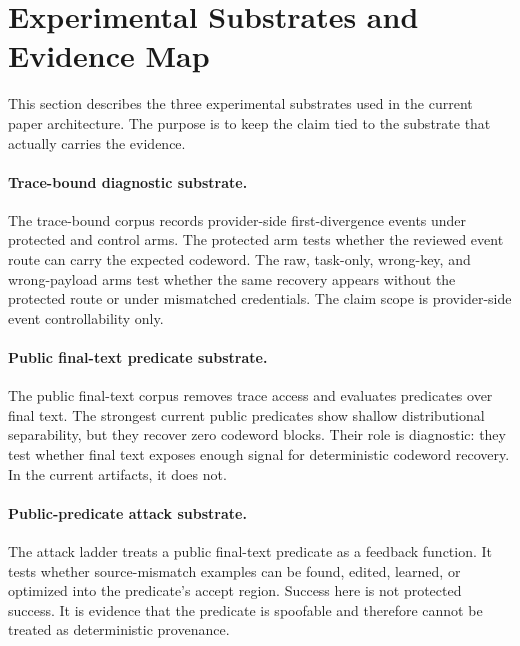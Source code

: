 \section{Experimental Substrates and Evidence Map}
\label{sec:evidence-map}

This section describes the three experimental substrates used in the current
paper architecture.  The purpose is to keep the claim tied to the substrate
that actually carries the evidence.

\paragraph{Trace-bound diagnostic substrate.}
The trace-bound corpus records provider-side first-divergence events under
protected and control arms.  The protected arm tests whether the reviewed
event route can carry the expected codeword.  The raw, task-only, wrong-key,
and wrong-payload arms test whether the same recovery appears without the
protected route or under mismatched credentials.  The claim scope is
provider-side event controllability only.

\paragraph{Public final-text predicate substrate.}
The public final-text corpus removes trace access and evaluates predicates
over final text.  The strongest current public predicates show shallow
distributional separability, but they recover zero codeword blocks.  Their
role is diagnostic: they test whether final text exposes enough signal for
deterministic codeword recovery.  In the current artifacts, it does not.

\paragraph{Public-predicate attack substrate.}
The attack ladder treats a public final-text predicate as a feedback function.
It tests whether source-mismatch examples can be found, edited, learned, or
optimized into the predicate's accept region.  Success here is not protected
success.  It is evidence that the predicate is spoofable and therefore cannot
be treated as deterministic provenance.

